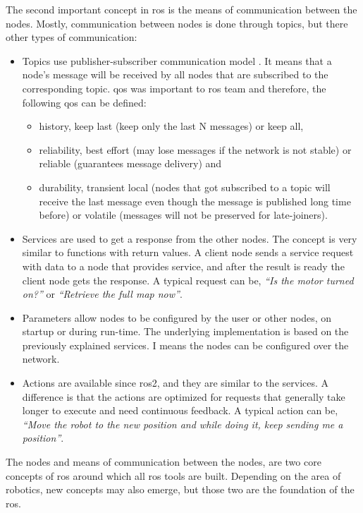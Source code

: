 The second important concept in \ac{ros} is the means of communication between the nodes.
Mostly, communication between nodes is done through topics, but there other types of communication:
\begin{itemize}
    \item Topics use publisher-subscriber communication model \cite{chen_beaconvey_2018}.
    It means that a node's message will be received by all nodes that are subscribed to the corresponding topic. 
    \ac{qos} was important to \ac{ros} team and therefore, the following \ac{qos} can be defined:
    \begin{itemize}
        \item history, keep last (keep only the last N messages) or keep all,
        \item reliability, best effort (may lose messages if the network is not stable) or reliable (guarantees message delivery) and
        \item durability, transient local (nodes that got subscribed to a topic will receive the last message even though the message is published long time before) or volatile (messages will not be preserved for late-joiners).
    \end{itemize}
    \item Services are used to get a response from the other nodes.
    The concept is very similar to functions with return values.
    A client node sends a service request with data to a node that provides service, and after the result is ready the client node gets the response.
    A typical request can be, \textit{``Is the motor turned on?''} or \textit{``Retrieve the full map now''}.
    \item Parameters allow nodes to be configured by the user or other nodes, on startup or during run-time.
    The underlying implementation is based on the previously explained services.
    I means the nodes can be configured over the network.
    \item Actions are available since \ac{ros2}, and they are similar to the services.
    A difference is that the actions are optimized for requests that generally take longer to execute and need continuous feedback. A typical action can be, \textit{``Move the robot to the new position and while doing it, keep sending me a position''}.
\end{itemize}

The nodes and means of communication between the nodes, are two core concepts of \ac{ros} around which all \ac{ros} tools are built.
Depending on the area of robotics, new concepts may also emerge, but those two are the foundation of the \ac{ros}.

